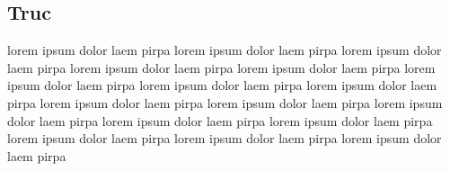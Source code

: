 \documentclass[11pt,fleqn]{book}
\begin{document}
\subsection{Truc}
lorem  ipsum  dolor  laem  pirpa  lorem  ipsum  dolor  laem  pirpa  lorem  ipsum  dolor  laem  pirpa  lorem  ipsum  dolor  laem  pirpa  lorem  ipsum  dolor  laem  pirpa  lorem  ipsum  dolor  laem  pirpa  lorem  ipsum  dolor  laem  pirpa  lorem  ipsum  dolor  laem  pirpa  lorem  ipsum  dolor  laem  pirpa  lorem  ipsum  dolor  laem  pirpa  lorem  ipsum  dolor  laem  pirpa  lorem  ipsum  dolor  laem  pirpa  lorem  ipsum  dolor  laem  pirpa  lorem  ipsum  dolor  laem  pirpa  lorem  ipsum  dolor  laem  pirpa  lorem  ipsum  dolor  laem  pirpa 
~\\
\end{document}
